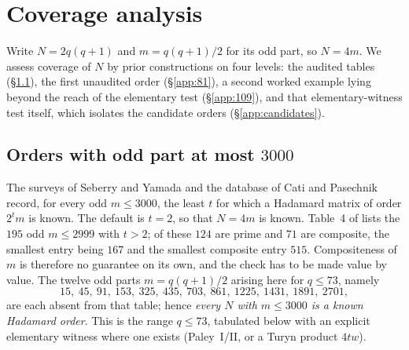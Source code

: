 \documentclass[11pt]{article}
\begin{document}
\appendix

\section{Coverage analysis}\label{app:coverage}

Write \(N=2q(q+1)\) and \(m=q(q+1)/2\) for its odd part, so
\(N=4m\).  We assess coverage of \(N\) by prior constructions on four
levels: the audited tables (\S\ref{app:audit}), the first unaudited
order (\S\ref{app:81}), a second worked example lying beyond the reach
of the elementary test (\S\ref{app:109}), and that elementary-witness
test itself, which isolates the candidate orders
(\S\ref{app:candidates}).

\subsection{Orders with odd part at most \texorpdfstring{\(3000\)}{3000}}
\label{app:audit}

The surveys of Seberry and Yamada \cite{SeberryYamada1992,
SeberryYamada2020} and the database of Cati and Pasechnik
\cite{CatiPasechnik2024} record, for every odd \(m\le 3000\), the least
\(t\) for which a Hadamard matrix of order \(2^{t}m\) is known.  The
default is \(t=2\), so that \(N=4m\) is known.  Table~4 of
\cite{CatiPasechnik2024} lists the \(195\) odd \(m\le2999\) with
\(t>2\); of these \(124\) are prime and \(71\) are composite, the
smallest entry being \(167\) and the smallest composite entry \(515\).
Compositeness of \(m\) is therefore no guarantee on its own, and the
check has to be made value by value.  The twelve odd parts
\(m=q(q+1)/2\) arising here for \(q\le73\), namely
\[
        15,\ 45,\ 91,\ 153,\ 325,\ 435,\ 703,\ 861,\ 1225,\ 1431,\ 1891,\ 2701,
\]
are each absent from that table; hence \emph{every \(N\) with
\(m\le3000\) is a known Hadamard order}.
This is the range \(q\le73\), tabulated below with an explicit
elementary witness where one exists (Paley~I/II, or a Turyn product
\(4tw\)).
\end{document}
